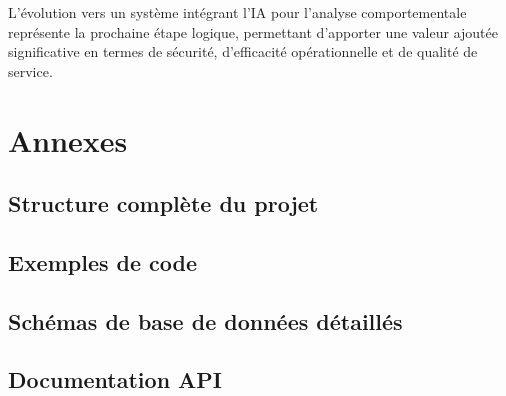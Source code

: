 \documentclass[a4paper, 12pt]{book}
\begin{document}
L'évolution vers un système intégrant l'IA pour l'analyse comportementale représente la prochaine étape logique, permettant d'apporter une valeur ajoutée significative en termes de sécurité, d'efficacité opérationnelle et de qualité de service.

\appendix

\chapter{Annexes}

\section{Structure complète du projet}

\section{Exemples de code}

\section{Schémas de base de données détaillés}

\section{Documentation API}



\end{document}

